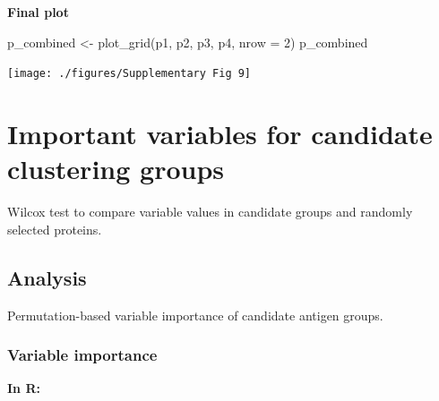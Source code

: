 \documentclass[
  11pt,
  oneside]{book}
\newenvironment{Shaded}{\begin{snugshade}}{\end{snugshade}}
\newcommand{\AttributeTok}[1]{\textcolor[rgb]{0.77,0.63,0.00}{#1}}
\newcommand{\DecValTok}[1]{\textcolor[rgb]{0.00,0.00,0.81}{#1}}
\newcommand{\FunctionTok}[1]{\textcolor[rgb]{0.00,0.00,0.00}{#1}}
\newcommand{\NormalTok}[1]{#1}
\newcommand{\OtherTok}[1]{\textcolor[rgb]{0.56,0.35,0.01}{#1}}
\begin{document}
\textbf{Final plot}

\begin{Shaded}
\begin{Highlighting}[]
\NormalTok{p\_combined }\OtherTok{\textless{}{-}} \FunctionTok{plot\_grid}\NormalTok{(p1, p2, p3, p4, }\AttributeTok{nrow =} \DecValTok{2}\NormalTok{)}
\NormalTok{p\_combined}
\end{Highlighting}
\end{Shaded}

\begin{center}\texttt{[image: ./figures/Supplementary Fig 9]} \end{center}

\hypertarget{important-variables-for-candidate-clustering-groups}{%
\section{Important variables for candidate clustering groups}\label{important-variables-for-candidate-clustering-groups}}

Wilcox test to compare variable values in candidate groups and randomly selected proteins.

\hypertarget{analysis-6}{%
\subsection{Analysis}\label{analysis-6}}

Permutation-based variable importance of candidate antigen groups.

\hypertarget{variable-importance-2}{%
\subsubsection{Variable importance}\label{variable-importance-2}}

\textbf{In R: }
\end{document}
